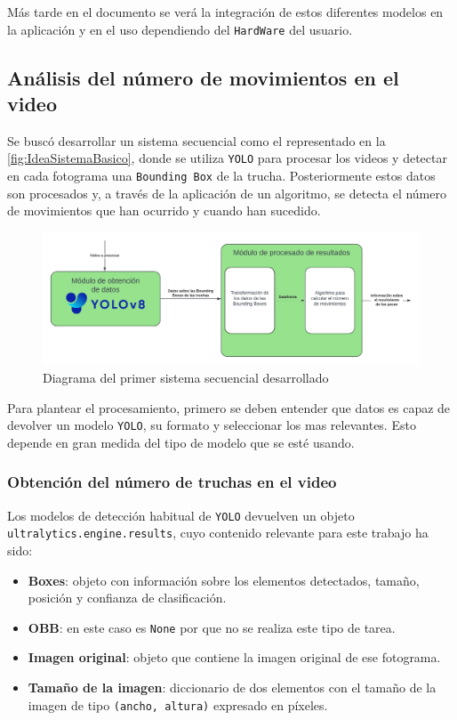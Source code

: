 Más tarde en el documento se verá la integración de estos diferentes modelos en la aplicación y en el uso dependiendo del \texttt{HardWare} del usuario.

\clearpage

\subsection{Análisis del número de movimientos en el video}



Se buscó desarrollar un sistema secuencial como el representado en la \autoref{fig:IdeaSistemaBasico}, donde se utiliza \texttt{YOLO} para procesar los videos y detectar en cada fotograma 
una \texttt{Bounding Box} de la trucha. Posteriormente estos datos son procesados y, a través de la aplicación de un algoritmo, se detecta el número de movimientos que han ocurrido y cuando han sucedido.

\begin{figure}[H]
    \centering
    \includegraphics[width=\textwidth]{images/6/6.3/DiagramaStandAlone.png}
    \caption{Diagrama del primer sistema secuencial desarrollado}
    \label{fig:IdeaSistemaBasico}
\end{figure}

Para plantear el procesamiento, primero se deben entender que datos es capaz de devolver un modelo \texttt{YOLO}, su formato y seleccionar los mas relevantes. Esto depende en gran medida del tipo de 
modelo que se esté usando.

\subsubsection{Obtención del número de truchas en el video}

Los modelos de detección habitual de \texttt{YOLO} devuelven un objeto \texttt{ultralytics.engine.results}, cuyo contenido relevante para este trabajo ha sido:

\begin{itemize}
    \item \textbf{Boxes}: objeto con información sobre los elementos detectados, tamaño, posición y confianza de clasificación.
    \item \textbf{OBB}: en este caso es \texttt{None} por que no se realiza este tipo de tarea.
    \item \textbf{Imagen original}: objeto que contiene la imagen original de ese fotograma.
    \item \textbf{Tamaño de la imagen}: diccionario de dos elementos con el tamaño de la imagen de tipo \texttt{(ancho, altura)} expresado en píxeles.
\end{itemize}

